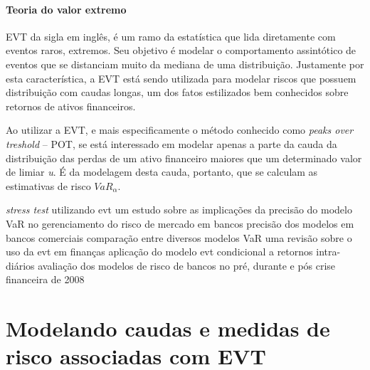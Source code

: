 \documentclass[review]{elsarticle}
\theoremstyle{definition}
\begin{document}

\paragraph{Teoria do valor extremo} EVT da sigla em inglês, é um ramo da estatística que lida diretamente com eventos raros, extremos. Seu objetivo é modelar o comportamento assintótico de eventos que se distanciam muito da mediana de uma distribuição. Justamente por esta característica, a EVT está sendo utilizada para modelar riscos que possuem distribuição com caudas longas, um dos fatos estilizados bem conhecidos sobre retornos de ativos financeiros.

Ao utilizar a EVT, e mais especificamente o método conhecido como \emph{peaks over treshold} – POT, se está interessado em modelar apenas a parte da cauda da distribuição das perdas de um ativo financeiro maiores que um determinado valor de limiar \emph{u}. É da modelagem desta cauda, portanto, que se calculam as estimativas de risco $VaR_\alpha$.


\cite{McNeil2000}
\cite{Longin2000} \emph{stress test} utilizando evt
\cite{Wong2003} um estudo sobre as implicações da precisão do modelo VaR no gerenciamento do risco de mercado em bancos
\cite{Berkowitz2002} precisão dos modelos em bancos comerciais
\cite{Bystroem2004}
\cite{Gencay2004}
\cite{Kuester2006} comparação entre diversos modelos VaR
\cite{Herrera2013}
\cite{Rocco2014} uma revisão sobre o uso da evt em finanças
\cite{Karmakar2014}
\cite{Chavez-Demoulin2016}
\cite{Karmakar2016} aplicação do modelo evt condicional a retornos intra-diários
\cite{OBrien2017} avaliação dos modelos de risco de bancos no pré, durante e pós crise financeira de 2008

\section{Modelando caudas e medidas de risco associadas com EVT}
\label{sec:caudas}
\end{document}

